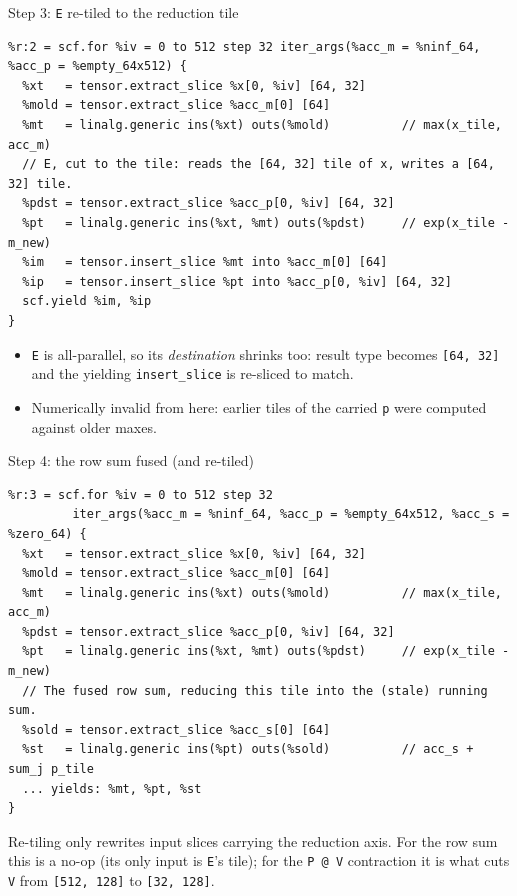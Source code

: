 \documentclass[10pt, aspectratio=169]{beamer}
\newcommand{\code}[1]{\texttt{\small #1}}
\begin{document}
\begin{frame}[fragile]{Step 3: \code{E} re-tiled to the reduction tile}
\begin{lstlisting}
%r:2 = scf.for %iv = 0 to 512 step 32 iter_args(%acc_m = %ninf_64, %acc_p = %empty_64x512) {
  %xt   = tensor.extract_slice %x[0, %iv] [64, 32]
  %mold = tensor.extract_slice %acc_m[0] [64]
  %mt   = linalg.generic ins(%xt) outs(%mold)          // max(x_tile, acc_m)
  // E, cut to the tile: reads the [64, 32] tile of x, writes a [64, 32] tile.
  %pdst = tensor.extract_slice %acc_p[0, %iv] [64, 32]
  %pt   = linalg.generic ins(%xt, %mt) outs(%pdst)     // exp(x_tile - m_new)
  %im   = tensor.insert_slice %mt into %acc_m[0] [64]
  %ip   = tensor.insert_slice %pt into %acc_p[0, %iv] [64, 32]
  scf.yield %im, %ip
}
\end{lstlisting}
  \begin{itemize}\small
    \item \code{E} is all-parallel, so its \emph{destination} shrinks too: result
      type becomes \code{[64, 32]} and the yielding \code{insert\_slice} is
      re-sliced to match.
    \item \alert{Numerically invalid from here}: earlier tiles of the carried
      \code{p} were computed against older maxes.
  \end{itemize}
\end{frame}

\begin{frame}[fragile]{Step 4: the row sum fused (and re-tiled)}
\begin{lstlisting}
%r:3 = scf.for %iv = 0 to 512 step 32
         iter_args(%acc_m = %ninf_64, %acc_p = %empty_64x512, %acc_s = %zero_64) {
  %xt   = tensor.extract_slice %x[0, %iv] [64, 32]
  %mold = tensor.extract_slice %acc_m[0] [64]
  %mt   = linalg.generic ins(%xt) outs(%mold)          // max(x_tile, acc_m)
  %pdst = tensor.extract_slice %acc_p[0, %iv] [64, 32]
  %pt   = linalg.generic ins(%xt, %mt) outs(%pdst)     // exp(x_tile - m_new)
  // The fused row sum, reducing this tile into the (stale) running sum.
  %sold = tensor.extract_slice %acc_s[0] [64]
  %st   = linalg.generic ins(%pt) outs(%sold)          // acc_s + sum_j p_tile
  ... yields: %mt, %pt, %st
}
\end{lstlisting}
  \small Re-tiling only rewrites input slices carrying the reduction axis. For the
  row sum this is a no-op (its only input is \code{E}'s tile); for the \code{P @ V}
  contraction it is what cuts \code{V} from \code{[512, 128]} to \code{[32, 128]}.
\end{frame}
\end{document}
